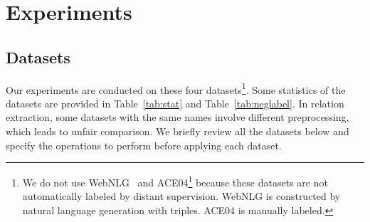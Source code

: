 \documentclass[11pt,a4paper]{article}
\begin{document}
\section{Experiments}
\subsection{Datasets}
\label{sec:data}
Our experiments are conducted on these four datasets\footnote{We do not use WebNLG~\cite{Gardent2017CreatingTC} and ACE04\footnote{\url{https://catalog.ldc.upenn.edu/LDC2005T09}} because these datasets are not automatically labeled by distant supervision. WebNLG is constructed by natural language generation with triples. ACE04 is manually labeled.}.
Some statistics of the datasets are provided in Table~\ref{tab:stat} and Table~\ref{tab:neglabel}.
In relation extraction, some datasets with the same names involve different preprocessing, which leads to unfair comparison. 
We briefly review all the datasets below and specify the operations to perform before applying each dataset.
\end{document}
